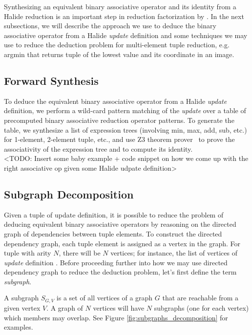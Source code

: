 Synthesizing an equivalent binary associative operator and its identity from a Halide reduction is an important step in reduction factorization by . In the next subsections, we will describe the approach we use to deduce the binary associative operator from a Halide \emph{update} definition and some techniques we may use to reduce the deduction problem for multi-element tuple reduction, e.g. argmin that returns tuple of the lowest value and its coordinate in an image.

\subsection{Forward Synthesis}

To deduce the equivalent binary associative operator from a Halide \emph{update} definition, we perform a wild-card pattern matching of the \emph{update} over a table of precomputed binary associative reduction operator patterns. To generate the table, we synthesize a list of expression trees (involving min, max, add, sub, etc.) for 1-element, 2-element tuple, etc., and use Z3 theorem prover~\cite{DeMoura:2008:ZES:1792734.1792766} to prove the associativity of the expression tree and to compute its identity. \\

<TODO: Insert some baby example + code snippet on how we come up with the right associative op given some Halide udpate definition> \\

\subsection{Subgraph Decomposition}

Given a tuple of update definition, it is possible to reduce the problem of deducing equivalent binary associative operators by reasoning on the directed graph of dependencies between tuple elements. To construct the directed dependency graph, each tuple element is assigned as a vertex in the graph. For tuple with arity $N$, there will be $N$ vertices; for instance, the list of vertices of \emph{update} definition . Before proceeding further into how we may use directed dependency graph to reduce the deduction problem, let's first define the term \emph{subgraph}. 

\begin{definition}
A subgraph $S_{G,V}$ is a set of all vertices of a graph $G$ that are reachable from a given vertex $V$. A graph of $N$ vertices will have $N$ subgraphs (one for each vertex) which members may overlap. See Figure \ref{fig:subgraphs_decomposition} for examples. 
\end{definition}


